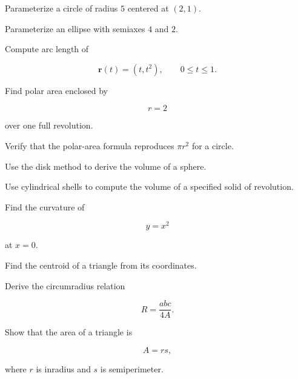 \begin{exercise}[2]
Parameterize a circle of radius \(5\) centered at \((2,1)\).
\end{exercise}

\begin{exercise}[2]
Parameterize an ellipse with semiaxes \(4\) and \(2\).
\end{exercise}

\begin{exercise}[3]
Compute arc length of

\[
\mathbf{r}(t)
=
(t,t^2),
\qquad
0\leq t\leq1.
\]
\end{exercise}

\begin{exercise}[3]
Find polar area enclosed by

\[
r=2
\]

over one full revolution.
\end{exercise}

\begin{exercise}[3]
Verify that the polar-area formula reproduces \(\pi r^2\) for a circle.
\end{exercise}

\begin{exercise}[3]
Use the disk method to derive the volume of a sphere.
\end{exercise}

\begin{exercise}[3]
Use cylindrical shells to compute the volume of a specified solid of
revolution.
\end{exercise}

\begin{exercise}[3]
Find the curvature of

\[
y=x^2
\]

at \(x=0\).
\end{exercise}

\begin{exercise}[3]
Find the centroid of a triangle from its coordinates.
\end{exercise}

\begin{exercise}[3]
Derive the circumradius relation

\[
R=\frac{abc}{4A}.
\]
\end{exercise}

\begin{exercise}[3]
Show that the area of a triangle is

\[
A=rs,
\]

where \(r\) is inradius and \(s\) is semiperimeter.
\end{exercise}

